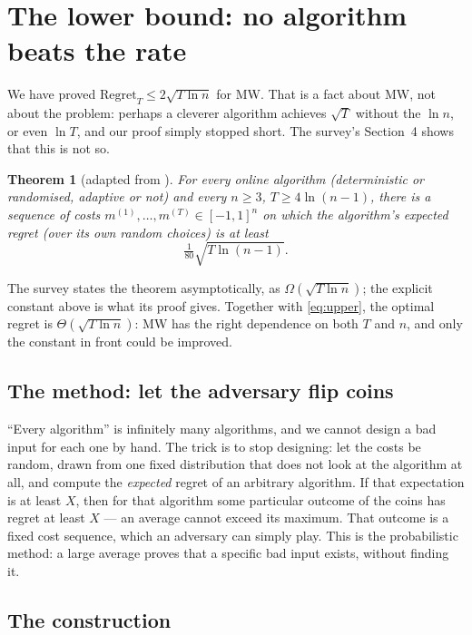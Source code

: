 \documentclass[11pt,a4paper]{article}
\theoremstyle{plain}
\newtheorem{theorem}{Theorem}[section]
\theoremstyle{definition}
\newcommand{\regret}{\mathrm{Regret}}
\newcommand{\sq}[1]{\sqrt{#1}}
\begin{document}
\clearpage
\section{The lower bound: no algorithm beats the rate}
\label{sec:lower}

We have proved $\regret_T \le 2\sq{T\ln n}$ for MW. That is a fact about MW, not about the problem: perhaps a cleverer algorithm achieves $\sq{T}$ without the $\ln n$, or even $\ln T$, and our proof simply stopped short. The survey's Section~4 shows that this is not so.

\begin{theorem}[{adapted from \cite[Theorem~4.1 and its proof]{AHK12}}]
\label{thm:lower}
For every online algorithm (deterministic or randomised, adaptive or not) and every $n \ge 3$, $T \ge 4\ln(n-1)$, there is a sequence of costs $m^{(1)},\dots,m^{(T)} \in [-1,1]^n$ on which the algorithm's expected regret (over its own random choices) is at least
\[
\tfrac{1}{80}\sq{T \ln (n-1)} .
\]
\end{theorem}

The survey states the theorem asymptotically, as $\Omega(\sq{T\ln n})$; the explicit constant above is what its proof gives. Together with \eqref{eq:upper}, the optimal regret is $\Theta(\sq{T\ln n})$: MW has the right dependence on both $T$ and $n$, and only the constant in front could be improved.

\subsection{The method: let the adversary flip coins}

``Every algorithm'' is infinitely many algorithms, and we cannot design a bad input for each one by hand. The trick is to stop designing: let the costs be random, drawn from one fixed distribution that does not look at the algorithm at all, and compute the \emph{expected} regret of an arbitrary algorithm. If that expectation is at least $X$, then for that algorithm some particular outcome of the coins has regret at least $X$ --- an average cannot exceed its maximum. That outcome is a fixed cost sequence, which an adversary can simply play. This is the probabilistic method: a large average proves that a specific bad input exists, without finding it.

\subsection{The construction}
\end{document}
